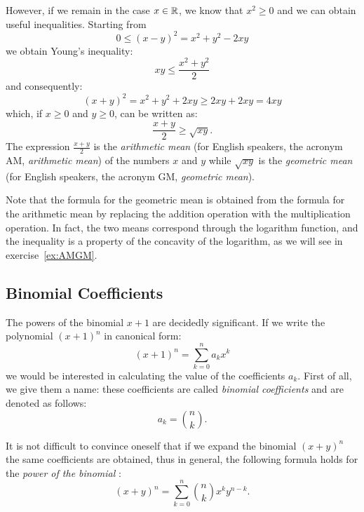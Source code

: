 However, if we remain in the case $x\in {\mathbb R}$, we know that $x^2\ge 0$
and we can obtain useful inequalities.
Starting from
\[
0 \le (x-y)^2 = x^2 + y^2 - 2xy
\]
we obtain Young's inequality:
%
%
\[
xy \le \frac{x^2+y^2}{2}
\]
and consequently:
\[
 (x+y)^2 = x^2 + y^2 + 2xy \ge 2xy + 2xy = 4 xy
\]
which, if $x\ge 0$ and $y\ge 0$, can be written as:
%
%
%
%
%
%
\[
   \frac{x+y}{2} \ge \sqrt{xy}.
\]
The expression $\frac{x+y}{2}$ is the \emph{arithmetic mean}
(for English speakers, the acronym AM, \emph{arithmetic mean})
of the numbers $x$ and $y$
while $\sqrt{xy}$ is the \emph{geometric mean}
(for English speakers, the acronym GM, \emph{geometric mean}).

Note that the formula for the geometric mean is obtained from the formula 
for the arithmetic mean by replacing the addition operation with 
the multiplication operation.
In fact, the two means correspond through the logarithm function,
and the inequality is a property of the concavity of the logarithm,  
as we will see in exercise~\ref{ex:AMGM}.

\subsection{Binomial Coefficients}
\label{ch:binomiale}

The powers of the binomial $x+1$ are decidedly significant. 
If we write the polynomial $(x+1)^n$ in canonical form:
\[
  (x+1)^n = \sum_{k=0}^n a_k x^k  
\]
we would be interested in calculating the value
of the coefficients $a_k$. 
First of all, we give them a name: these coefficients are called 
\emph{binomial coefficients}%
%
%
and are denoted as follows:%
%
\[
    a_k = {n \choose k}.
\]

It is not difficult to convince oneself that if we expand the binomial $(x+y)^n$
the same coefficients are obtained, thus
in general, the following formula holds for the \emph{power of the binomial}%
%
:
% 
\begin{equation*}
  (x+y)^n = \sum_{k=0}^n {n \choose k} x^k y^{n-k}. 
\end{equation*}

